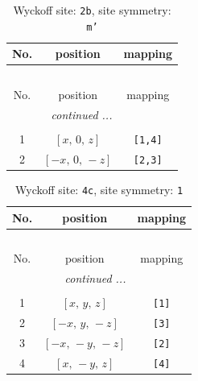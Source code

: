 \documentclass[fleqn,8pt]{jsarticle}
\begin{document}
\begin{longtable}{ccc}
\caption{Wyckoff site: {\tt 2b}, site symmetry: {\tt m'}}
 \\
 \hline \hline
No. & position & mapping \\ \hline \endfirsthead

\multicolumn{2}{l}{\tablename\ \thetable{}} \\
 \hline \hline
No. & position & mapping \\ \hline \endhead

 \hline \hline
\multicolumn{2}{r}{\footnotesize\it continued ...} \\ \endfoot

 \hline \hline
\multicolumn{2}{r}{} \\ \endlastfoot

1 & $\left[ x,\, 0,\, z \right]$ & {\tt [1,4]} \\ \hline
2 & $\left[ - x,\, 0,\, - z \right]$ & {\tt [2,3]} \\
\end{longtable}
\renewcommand{\arraystretch}{1.2}
\begin{longtable}{ccc}
\caption{Wyckoff site: {\tt 4c}, site symmetry: {\tt 1}}
 \\
 \hline \hline
No. & position & mapping \\ \hline \endfirsthead

\multicolumn{2}{l}{\tablename\ \thetable{}} \\
 \hline \hline
No. & position & mapping \\ \hline \endhead

 \hline \hline
\multicolumn{2}{r}{\footnotesize\it continued ...} \\ \endfoot

 \hline \hline
\multicolumn{2}{r}{} \\ \endlastfoot

1 & $\left[ x,\, y,\, z \right]$ & {\tt [1]} \\ \hline
2 & $\left[ - x,\, y,\, - z \right]$ & {\tt [3]} \\ \hline
3 & $\left[ - x,\, - y,\, - z \right]$ & {\tt [2]} \\ \hline
4 & $\left[ x,\, - y,\, z \right]$ & {\tt [4]} \\
\end{longtable}
\end{document}
